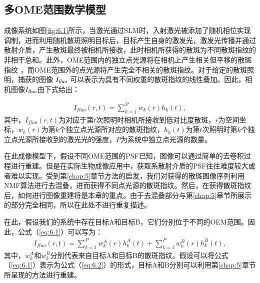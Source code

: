 \subsection{多OME范围数学模型}

成像系统如图\ref{fig:6.1}所示，当激光通过SLM时，入射激光被添加了随机相位实现调制，进而利用随机散斑照明目标后，目标产生自身的激发光，激发光传播并通过散射介质，产生散斑最终被相机所接收，此时相机所获得的散斑为不同散斑指纹的非相干总和。此外，OME范围内的独立点光源将在相机上产生相关但平移的散斑指纹 \cite{Freund1988}，而OME范围外的点光源将产生完全不相关的散斑指纹。对于给定的散斑照明，捕获的图像 $I_{\textsl{fluo}}$ 可以表示为具有不同权重的散斑指纹的线性叠加。因此，相机图像$I_{\textsl{fluo}}$由下式给出：

\begin{equation}
\begin{aligned}
I_{fluo}(r,t) = \sum^{P}_{k=1} w_{k}(r) h_{k}(t),
\label{eq:6.1}
\end{aligned}
\end{equation}
其中，$I_{fluo}(r,t)$为对应于第$t$次照明时相机所接收到低对比度散斑，$r$为空间坐标，$w_{k}(r)$为第$k$个独立点光源所对应的散斑指纹，$h_{k}(t)$为第$t$次照明时第$k$个独立点光源所接收到的激光光的强度，$P$为系统中独立点光源的数量。

在此成像模型下，假设不同OME范围的PSF已知，图像可以通过简单的去卷积过程进行重建。但是在实际生物成像应用中，获取系散射介质的PSF往往难度较大或者难以实现。受到第\ref{chap:5}章节方法的启发，我们对获得的散斑图像序列利用NMF算法进行去混叠，进而获得不同点光源的散斑指纹。然后，在获得散斑指纹后，如何进行图像重建将是本章的重点。由于去混叠部分与第\ref{chap:5}章节所展示的部分完全相同，所以在此处不进行重复描述。

在此，假设我们的系统中存在目标A和目标B，它们分别位于不同的OEM范围。因此，公式（\ref{eq:6.1}）可以写为：
\begin{equation}
\begin{aligned}
I_{fluo}(r,t) = \sum^{P}_{k=1} w_{k}^{A}(r) h_{k}^{A}(t)+\sum^{P}_{k=1} w_{k}^{B}(r) h_{k}^{B}(t),
\label{eq:6.2}
\end{aligned}
\end{equation}
其中，$w_{k}^{A}$和$w_{k}^{B}$分别代表来自目标A和目标B的散斑指纹。假设可以将公式（\ref{eq:6.1}）表示为公式（\ref{eq:6.2}）的形式，目标A和B分别可以利用第\ref{chap:5}章节所呈现的方法进行重建。

